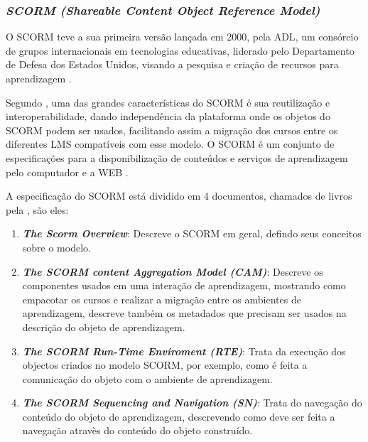 \subsubsection{\textit{SCORM (Shareable Content Object Reference Model)}}
O \ac{SCORM} teve a sua primeira versão lançada em 2000, pela \ac{ADL}, um consórcio de grupos internacionais em tecnologias educativas, liderado pelo Departamento de Defesa dos Estados Unidos, visando a pesquisa e criação de recursos para aprendizagem \cite{adl}.
\par
Segundo , uma das grandes características do \ac{SCORM} é sua reutilização e interoperabilidade, dando independência da plataforma onde os objetos do SCORM podem ser usados, facilitando assim a migração dos cursos entre os diferentes \ac{LMS} compatíveis com esse modelo. O \ac{SCORM} é um conjunto de especificações para a disponibilização de conteúdos e serviços de aprendizagem pelo computador e a \ac{WEB} \cite{adl}.
\par
A especificação do \ac{SCORM} está dividido em 4 documentos, chamados de livros pela \cite{adl}, são eles:
\begin{enumerate}
  \item \textbf{\textit{The Scorm Overview}}: Descreve o \ac{SCORM} em geral, defindo seus conceitos sobre o modelo.
  \item \textbf{\textit{The SCORM content Aggregation Model (CAM)}}: Descreve os componentes usados em uma interação de aprendizagem, mostrando como empacotar os cursos e realizar a migração entre os ambientes de aprendizagem, descreve também os metadados que precisam ser usados na descrição do objeto de aprendizagem.
  \item \textbf{\textit{The SCORM Run-Time Enviroment (RTE)}}: Trata da execução dos objectos criados no modelo \ac{SCORM}, por exemplo, como é feita a comunicação do objeto com o ambiente de aprendizagem.
  \item \textbf{\textit{The SCORM Sequencing and Navigation (SN)}}: Trata do navegação do conteúdo do objeto de aprendizagem, descrevendo como deve ser feita a navegação atravès do conteúdo do objeto construído.
\end{enumerate}

